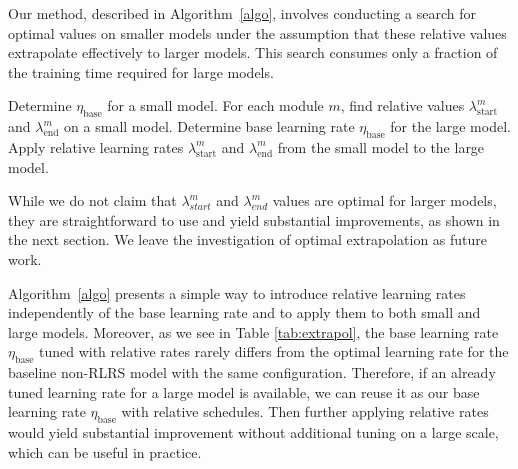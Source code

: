 \documentclass{article} %
\newcommand{\jl}[1]{\textcolor{green}{[JL: #1]}}
\begin{document}
    Our method, described in Algorithm~\ref{algo}, involves conducting a search for optimal values on smaller models under the assumption that these relative values extrapolate effectively to larger models. This search consumes only a fraction of the training time required for large models.

    \begin{algorithm}
    \caption{Relative Learning Rate Adjustment Procedure}
    \begin{algorithmic}[1]
    \State Determine $\eta_{\text{base}}$ for a small model.
    \State For each module $m$, find relative values $\lambda_{\text{start}}^m$ and $\lambda_{\text{end}}^m$ on a small model.
    \State Determine base learning rate $\eta_{\text{base}}$ for the large model.
    \State Apply relative learning rates $\lambda_{\text{start}}^m$ and $\lambda_{\text{end}}^m$ from the small model to the large model.
    \end{algorithmic}
    \label{algo}
    \end{algorithm}

    While we do not claim that $\lambda_{\textit{start}}^m$ and $\lambda_{\textit{end}}^m$ values are optimal for larger models, they are straightforward to use and yield substantial improvements, as shown in the next section. We leave the investigation of optimal extrapolation as future work. %



    Algorithm~\ref{algo} presents a simple way to introduce relative learning rates independently of the base learning rate and to apply them to both small and large models. Moreover, as we see in Table \ref{tab:extrapol}, the base learning rate $\eta_{\text{base}}$ tuned with relative rates rarely differs from the optimal learning rate for the baseline non-RLRS model with the same configuration. Therefore, if an already tuned learning rate for a large model is available, we can reuse it as our base learning rate $\eta_{\text{base}}$ with relative schedules. Then further applying relative rates would yield substantial improvement without additional tuning on a large scale, which can be useful in practice.
\end{document}
